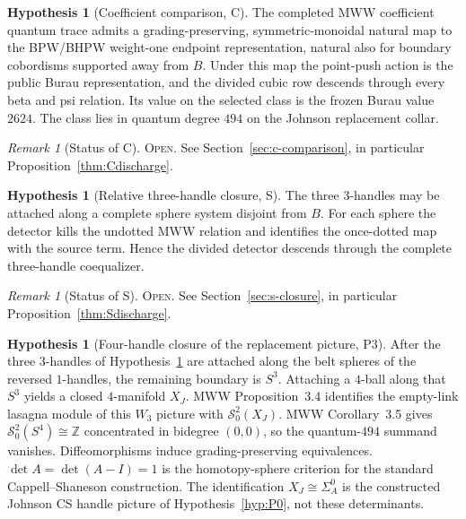 \documentclass[11pt]{amsart}
\theoremstyle{definition}
\newtheorem{hypothesis}[theorem]{Hypothesis}
\theoremstyle{remark}
\newtheorem{remark}[theorem]{Remark}
\newcommand{\Open}{\textnormal{\textsc{Open}}}
\begin{document}
\begin{hypothesis}[Coefficient comparison, C]\label{hyp:P1}
The completed MWW coefficient quantum trace admits a grading-preserving,
symmetric-monoidal natural map to the BPW/BHPW weight-one endpoint
representation, natural also for boundary cobordisms supported away from
$B$.  Under this map the point-push action is the public Burau
representation, and the divided cubic row descends through every beta and psi
relation.  Its value on the selected class is the frozen Burau value
$2624$.  The class lies in quantum degree $494$ on the Johnson replacement
collar.
\end{hypothesis}

\begin{remark}[Status of C]
\Open.  See Section~\ref{sec:c-comparison}, in particular
Proposition~\ref{thm:Cdischarge}.
\end{remark}

\begin{hypothesis}[Relative three-handle closure, S]\label{hyp:P2}
The three $3$-handles may be
attached along a complete sphere system disjoint from $B$.  For each sphere
the detector kills the undotted MWW relation and identifies the once-dotted
map with the source term.  Hence the divided detector descends through the
complete three-handle coequalizer.
\end{hypothesis}

\begin{remark}[Status of S]
\Open.  See Section~\ref{sec:s-closure}, in particular
Proposition~\ref{thm:Sdischarge}.
\end{remark}

\begin{hypothesis}[Four-handle closure of the replacement picture, P3]\label{hyp:P3}
After the three $3$-handles of Hypothesis~\ref{hyp:P2} are attached along
the belt spheres of the reversed $1$-handles, the remaining boundary is
$S^3$.  Attaching a $4$-ball along that $S^3$ yields a closed $4$-manifold
$X_J$.  MWW Proposition~3.4 identifies the empty-link lasagna module of this
$W_3$ picture with $\mathcal S^2_0(X_J)$.  MWW Corollary~3.5 gives
$\mathcal S^2_0(S^4)\cong\mathbb Z$ concentrated in bidegree $(0,0)$, so
the quantum-$494$ summand vanishes.  Diffeomorphisms induce
grading-preserving equivalences.  $\det A=\det(A-I)=1$ is the
homotopy-sphere criterion for the standard Cappell--Shaneson construction.
The identification $X_J\cong\Sigma_A^0$ is the constructed Johnson CS
handle picture of Hypothesis~\ref{hyp:P0}, not these determinants.
\end{hypothesis}
\end{document}
